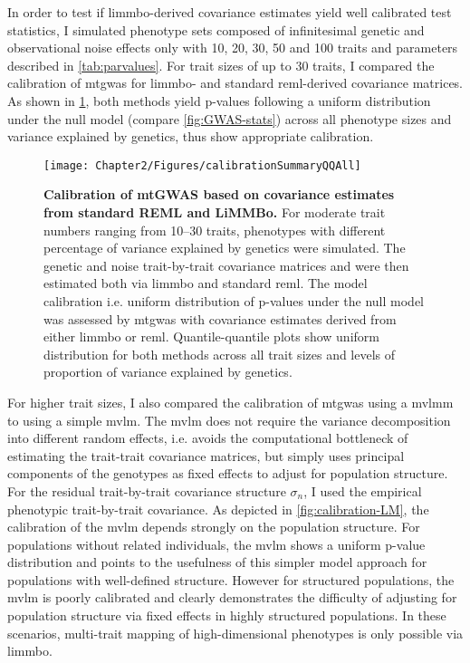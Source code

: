 In order to test if \gls{limmbo}-derived covariance estimates yield well calibrated test statistics, I simulated phenotype sets composed of infinitesimal genetic and observational noise effects only with \num{10}, \num{20}, \num{30}, \num{50} and \num{100} traits and parameters described in \cref{tab:parvalues}. For trait sizes of up to \num{30} traits, I compared the calibration of \gls{mtgwas} for \gls{limmbo}- and standard \gls{reml}-derived covariance matrices. As shown in \cref{fig:calibration}, both methods yield p-values following a uniform distribution under the null model (compare \cref{fig:GWAS-stats}) across all phenotype sizes and variance explained by genetics, thus show appropriate calibration. 
%
\begin{figure}[h!]
	\centering	
	\texttt{[image: Chapter2/Figures/calibrationSummaryQQAll]}\\
	\caption[\textbf{Calibration of mtGWAS based on covariance estimates from standard REML and LiMMBo.}]{\textbf{Calibration of mtGWAS based on covariance estimates from standard REML and LiMMBo.} For moderate trait numbers ranging from \numrange{10}{30} traits, phenotypes with different percentage of variance explained by genetics were simulated. The genetic and noise trait-by-trait covariance matrices  and  were then estimated both via \gls{limmbo} and standard \gls{reml}. The model calibration i.e. uniform distribution of p-values under the null model was assessed by \gls{mtgwas} with covariance estimates derived from either \gls{limmbo} or \gls{reml}. Quantile-quantile plots show uniform distribution for both methods across all trait sizes and levels of proportion of variance explained by genetics.}
	  \label{fig:calibration}%
	  \vspace{-2mm}
\end{figure}
%
For higher trait sizes, I also compared the calibration of \gls{mtgwas} using a \gls{mvlmm} to using a simple \gls{mvlm}. The \gls{mvlm} does not require the variance decomposition into different random effects, i.e. avoids the computational bottleneck of estimating the trait-trait covariance matrices, but simply uses principal components of the genotypes as fixed effects to adjust for population structure. For the residual trait-by-trait covariance structure \(\sigma_n\), I used the empirical phenotypic trait-by-trait covariance. As depicted in \cref{fig:calibration-LM}, the calibration of the \gls{mvlm} depends strongly on the population structure. For populations without related individuals, the \gls{mvlm} shows a uniform p-value distribution and points to the usefulness of this simpler model approach for populations with well-defined structure. However for structured populations, the \gls{mvlm} is poorly calibrated and clearly demonstrates the difficulty of adjusting for population structure via fixed effects in highly structured populations. In these scenarios, multi-trait mapping of high-dimensional phenotypes is only possible via \gls{limmbo}. 

